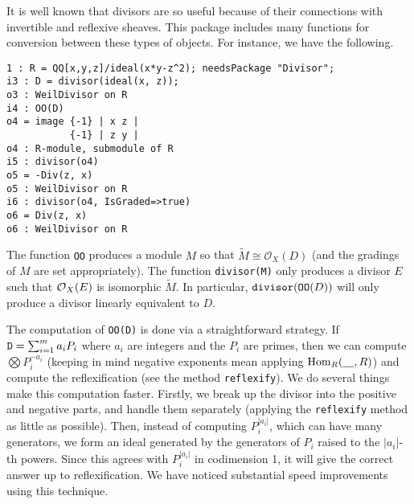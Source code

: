 \documentclass[11pt]{amsart}
\begin{document}
It is well known that divisors are so useful because of their connections with invertible and reflexive sheaves.  This package includes many functions for conversion between these types of objects.  For instance, we have the following.
\begin{verbatim}
1 : R = QQ[x,y,z]/ideal(x*y-z^2); needsPackage "Divisor";
i3 : D = divisor(ideal(x, z));
o3 : WeilDivisor on R
i4 : OO(D)
o4 = image {-1} | x z |
           {-1} | z y |
o4 : R-module, submodule of R
i5 : divisor(o4)
o5 = -Div(z, x)
o5 : WeilDivisor on R
i6 : divisor(o4, IsGraded=>true)
o6 = Div(z, x)
o6 : WeilDivisor on R
\end{verbatim}
The function {\tt OO} produces a module $M$ so that $\widetilde{M} \cong \mathcal{O}_X(D)$ (and the gradings of $M$ are set appropriately).  The function {\tt divisor(M)} only produces a divisor $E$ such that $\mbox{$\mathcal{O}$}_X(E)$ is isomorphic $\widetilde{M}$.  In particular, ${\tt divisor}({\tt OO}(D))$ will only produce a divisor linearly equivalent to $D$.  %

The computation of {\tt OO(D)} is done via a straightforward strategy.  If ${\tt D} = \sum_{i = 1}^m a_i P_i$ where $a_i$ are integers and the $P_i$ are primes, then we can compute $\bigotimes P_i^{-a_i}$ (keeping in mind negative exponents mean applying $\operatorname{Hom}_R(\underline{\hskip 10pt}, R)$) and compute the reflexification (see the method {\tt reflexify}).  We do several things make this computation faster.  Firstly, we break up the divisor into the positive and negative parts, and handle them separately (applying the {\tt reflexify} method as little as possible).  Then, instead of computing $P_i^{|a_i|}$, which can have many generators, we form an ideal generated by the generators of $P_i$ raised to the $|a_i|$-th powers.  Since this agrees with $P_i^{|a_i|}$ in codimension 1, it will give the correct answer up to reflexification.  We have noticed substantial speed improvements using this technique.
\end{document}
